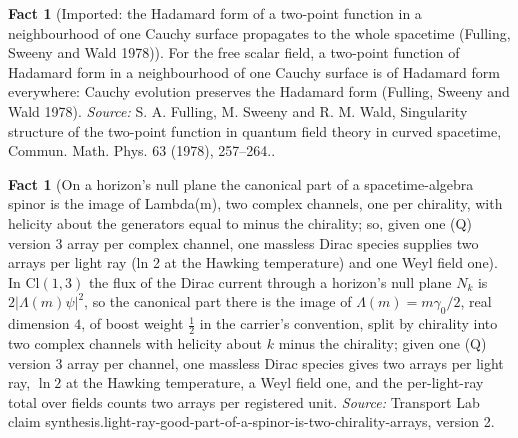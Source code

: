 \documentclass[11pt]{article}
\theoremstyle{definition}
\newtheorem{fact}[theorem]{Fact}
\theoremstyle{plain}
\providecommand{\Cl}{}\renewcommand{\Cl}{\mathrm{Cl}}
\begin{document}
\begin{fact}[Imported: the Hadamard form of a two-point function in a neighbourhood of one Cauchy surface propagates to the whole spacetime (Fulling, Sweeny and Wald 1978)]\label{c:synthesis.imported-propagation-of-hadamard-form}
For the free scalar field, a two-point function of Hadamard form in a neighbourhood of one Cauchy surface is of Hadamard form everywhere: Cauchy evolution preserves the Hadamard form (Fulling, Sweeny and Wald 1978).
\emph{Source:} S. A. Fulling, M. Sweeny and R. M. Wald, Singularity structure of the two-point function in quantum field theory in curved spacetime, Commun. Math. Phys. 63 (1978), 257--264..
\end{fact}

\begin{fact}[On a horizon's null plane the canonical part of a spacetime-algebra spinor is the image of Lambda(m), two complex channels, one per chirality, with helicity about the generators equal to minus the chirality; so, given one (Q) version 3 array per complex channel, one massless Dirac species supplies two arrays per light ray (ln 2 at the Hawking temperature) and one Weyl field one]\label{c:synthesis.light-ray-good-part-of-a-spinor-is-two-chirality-arrays}
In $\Cl(1,3)$ the flux of the Dirac current through a horizon's null plane $N_{k}$ is $2|\Lambda(m)\psi|^{2}$, so the canonical part there is the image of $\Lambda(m) = m\gamma_{0}/2$, real dimension $4$, of boost weight $\tfrac12$ in the carrier's convention, split by chirality into two complex channels with helicity about $k$ minus the chirality; given one (Q) version 3 array per channel, one massless Dirac species gives two arrays per light ray, $\ln 2$ at the Hawking temperature, a Weyl field one, and the per-light-ray total over fields counts two arrays per registered unit.
\emph{Source:} Transport Lab claim synthesis.light-ray-good-part-of-a-spinor-is-two-chirality-arrays, version 2.
\end{fact}
\end{document}
